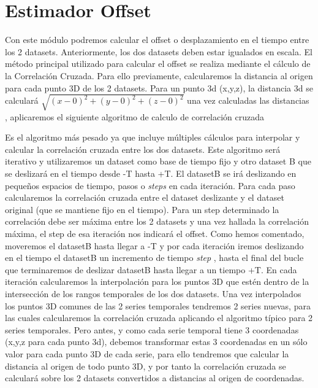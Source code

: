 \section{Estimador Offset}

	Con este módulo podremos calcular el offset o desplazamiento en el tiempo entre los 2 datasets.
	Anteriormente, los dos datasets deben estar igualados en escala. El método principal utilizado para calcular el offset se realiza mediante el cálculo de la Correlación Cruzada.
	Para ello previamente, calcularemos la distancia al origen para cada punto 3D de los 2 datasets.
	Para un punto 3d (x,y,z), la distancia 3d se calculará 
	\begin{math}
	\sqrt{(x-0)^2 +(y-0)^2+(z-0)^2}
	\end{math}
	una vez calculadas las distancias , aplicaremos el siguiente algoritmo de calculo de correlación cruzada

Es el algoritmo más pesado ya que incluye múltiples cálculos para interpolar y calcular 
la correlación cruzada entre los dos datasets. Este algoritmo será iterativo y utilizaremos un dataset como base de tiempo fijo y otro dataset B que se deslizará en el tiempo desde -T hasta +T. El datasetB se irá deslizando en pequeños espacios de tiempo, pasos o \textit{steps} en cada iteración. Para cada paso calcularemos la correlación cruzada entre el dataset deslizante y el dataset original (que se mantiene fijo en el tiempo). Para un step determinado la correlación debe ser máxima entre los 2 datasets y una vez hallada la correlación máxima, el step de esa iteración nos 
indicará el offset.
Como hemos comentado, moveremos el datasetB hasta llegar a -T y por cada iteración iremos deslizando en el tiempo el datasetB un incremento de tiempo \textit{step} , hasta el final del bucle que terminaremos de deslizar datasetB hasta llegar a un tiempo +T. En cada iteración calcularemos la interpolación para los puntos 3D que estén dentro de la intersección de los rangos temporales de los dos datasets. Una vez interpolados los puntos 3D comunes de las 2 series temporales tendremos 2 series nuevas, para las cuales calcularemos la correlación cruzada aplicando el algoritmo típico para 2 series temporales. Pero antes, y como cada serie temporal tiene 3 coordenadas (x,y,z para cada punto 3d), debemos transformar estas 3 coordenadas en un sólo valor para cada punto 3D de cada serie, para ello tendremos que calcular la distancia al origen de todo punto 3D, y por tanto la correlación cruzada se calculará sobre los 2 datasets convertidos a distancias al origen de coordenadas.


